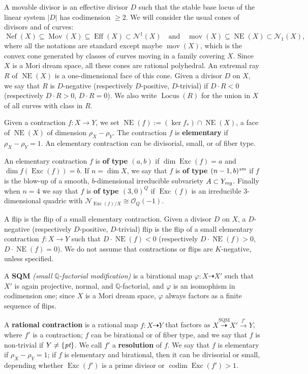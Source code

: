\documentclass[a4paper,12pt]{amsart}
\theoremstyle{definition}
\numberwithin{figure}{section}
\numberwithin{table}{section}
\newcommand{\ph}{\varphi}
\newcommand{\ma}{\mathcal}
\newcommand{\ol}{\mathcal{O}}
\newcommand{\Q}{\mathbb{Q}}
\newcommand{\N}{\mathcal{N}_1}
\newcommand{\Nu}{\mathcal{N}^1}
\newcommand{\NE}{\operatorname{NE}}
\newcommand{\Exc}{\operatorname{Exc}}
\newcommand{\Lo}{\operatorname{Locus}}
\newcommand{\codim}{\operatorname{codim}}
\newcommand{\Eff}{\operatorname{Eff}}
\newcommand{\Nef}{\operatorname{Nef}}
\newcommand{\Mov}{\operatorname{Mov}}
\newcommand{\mov}{\operatorname{mov}}
\newcommand{\sm}{\text{\it sm}}
\newcommand{\pt}{\text{\it pt}}
\newcommand{\reg}{\text{\it reg}}
\begin{document}
A movable divisor is an effective divisor $D$ such that the stable
 base locus of the linear system $|D|$  has codimension $\geq 2$. 
We will consider the usual cones of divisors and of curves: $$\Nef(X)\subseteq\Mov(X)\subseteq\Eff(X)\subset\Nu(X)\quad\text{and}\quad
\mov(X)\subseteq \NE(X)\subset\N(X),$$ where 
all the notations are standard except maybe $\mov(X)$, which is the convex cone generated by classes of curves moving in a family covering $X$.
Since $X$ is a Mori dream space, all these cones are  rational polyhedral. An extremal ray $R$ of $\NE(X)$ is a one-dimensional face of this cone. Given  a divisor $D$ on $X$, we say that $R$ is $D$-negative (respectively $D$-positive,  $D$-trivial)  if $D\cdot R<0$ (respectively $D\cdot R>0$,  $D\cdot R=0$). We also write $\Lo(R)$ for the union in $X$ of all curves with class in $R$. 

Given a contraction $f\colon X\to Y$, we set $\NE(f):=(\ker f_*)\cap\NE(X)$, a face of $\NE(X)$ of dimension $\rho_X-\rho_Y$.
The contraction $f$ is {\bf elementary} if $\rho_X-\rho_Y=1$. An elementary contraction can be divisorial, small, or of fiber type.

An elementary contraction $f$ is {\bf of type $(a,b)$} if $\dim\Exc(f)=a$ and $\dim f(\Exc(f))=b$. If $n=\dim X$, we say that $f$ is {\bf of type $(n-1,b)^{\sm}$} if $f$ is the blow-up of a smooth, $b$-dimensional irreducible subvariety $A\subset Y_{\reg}$. Finally when $n=4$ we say that  $f$ is {\bf of type $(3,0)^{Q}$} if $\Exc(f)$ is an irreducible $3$-dimensional quadric with 
$\ma{N}_{\Exc(f)/X}\cong\ol_Q(-1)$.

A  flip is the flip of a small elementary contraction. Given  a divisor $D$ on $X$, a $D$-negative (respectively $D$-positive, $D$-trivial) flip is the flip of a small elementary contraction $f\colon X\to Y$ such that $D\cdot\NE(f)<0$
(respectively $D\cdot\NE(f)>0$, $D\cdot\NE(f)=0$). We do not assume that contractions or flips are $K$-negative, unless specified.

    A {\bf SQM} \emph{(small $\Q$-factorial modification)} is a birational map $\ph\colon X\dasharrow X'$ such that $X'$ is again projective, normal, and $\Q$-factorial, and $\ph$ is an isomophism in codimension one; since $X$ is a Mori dream space, $\ph$ always factors as a finite sequence of flips.

    A {\bf rational contraction} is a rational map $f\colon X\dasharrow Y$ that factors as $X\stackrel{\text{SQM}}{\dasharrow} X'\stackrel{f'}{\to} Y$, where $f'$ is a contraction; $f$ can be birational or of fiber type, and we say that $f$ is non-trivial if $Y\neq\{\pt\}$. We  call $f'$ a {\bf resolution} of $f$. We say that $f$ is elementary if $\rho_X-\rho_Y=1$; if $f$ is elementary and birational, then it can be divisorial or small, depending whether $\Exc(f')$ is a prime divisor or $\codim\Exc(f')>1$.
\end{document}
